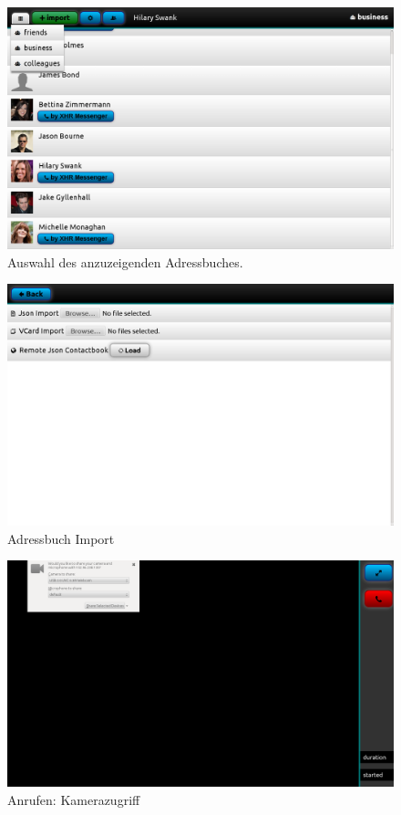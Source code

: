 	\begin{figure}[H]
		\centering
		\includegraphics[height=0.4\textheight]{../ui/img/finalUi/contactView2.png}
		\caption{Auswahl des anzuzeigenden Adressbuches.}
		\label{contactbook change}
	\end{figure}
	\begin{figure}[H]
		\centering
		\includegraphics[height=0.4\textheight]{../ui/img/finalUi/importView.png}
		\caption{Adressbuch Import}
		\label{contactbook import screen}
	\end{figure}
	\begin{figure}[H]
		\centering
		\includegraphics[height=0.4\textheight]{../ui/img/finalUi/cameraAccess.png}
		\caption{Anrufen: Kamerazugriff}
		\label{phone screen camera access}
	\end{figure}
